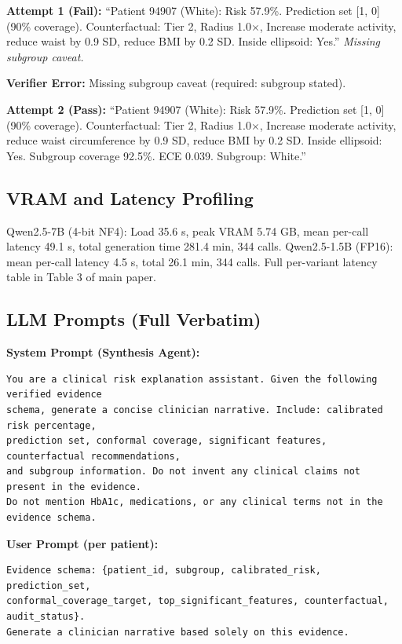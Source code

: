 \documentclass[11pt,a4paper]{article}
\theoremstyle{plain}
\begin{document}
\textbf{Attempt 1 (Fail):} ``Patient 94907 (White): Risk 57.9\%. Prediction set [1, 0] (90\% coverage). Counterfactual: Tier 2, Radius 1.0$\times$, Increase moderate activity, reduce waist by 0.9 SD, reduce BMI by 0.2 SD. Inside ellipsoid: Yes.'' \textit{Missing subgroup caveat.}

\textbf{Verifier Error:} Missing subgroup caveat (required: subgroup stated).

\textbf{Attempt 2 (Pass):} ``Patient 94907 (White): Risk 57.9\%. Prediction set [1, 0] (90\% coverage). Counterfactual: Tier 2, Radius 1.0$\times$, Increase moderate activity, reduce waist circumference by 0.9 SD, reduce BMI by 0.2 SD. Inside ellipsoid: Yes. Subgroup coverage 92.5\%. ECE 0.039. Subgroup: White.''

\subsection{VRAM and Latency Profiling}

Qwen2.5-7B (4-bit NF4): Load 35.6 s, peak VRAM 5.74 GB, mean per-call latency 49.1 s, total generation time 281.4 min, 344 calls. Qwen2.5-1.5B (FP16): mean per-call latency 4.5 s, total 26.1 min, 344 calls. Full per-variant latency table in Table 3 of main paper.

\subsection{LLM Prompts (Full Verbatim)}

\textbf{System Prompt (Synthesis Agent):}
{\footnotesize
\begin{verbatim}
You are a clinical risk explanation assistant. Given the following verified evidence
schema, generate a concise clinician narrative. Include: calibrated risk percentage,
prediction set, conformal coverage, significant features, counterfactual recommendations,
and subgroup information. Do not invent any clinical claims not present in the evidence.
Do not mention HbA1c, medications, or any clinical terms not in the evidence schema.
\end{verbatim}
}

\textbf{User Prompt (per patient):}
{\footnotesize
\begin{verbatim}
Evidence schema: {patient_id, subgroup, calibrated_risk, prediction_set,
conformal_coverage_target, top_significant_features, counterfactual, audit_status}.
Generate a clinician narrative based solely on this evidence.
\end{verbatim}
}
\end{document}
